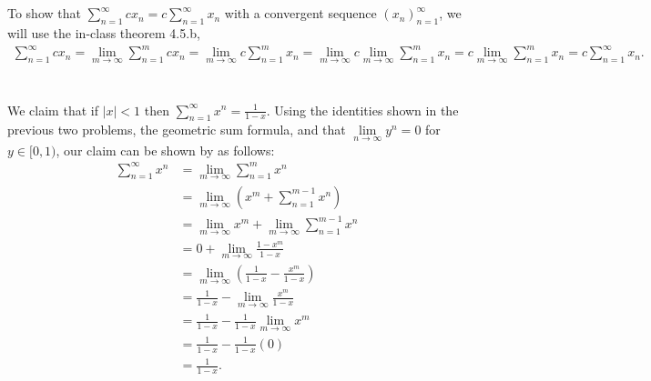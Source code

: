 \documentclass[12 pt,letterpaper]{article}
\begin{document}
\section{}
To show that \(\sum_{n=1}^{\infty}cx_n = c\sum_{n=1}^{\infty}x_n\)
with a convergent sequence \((x_n)_{n=1}^\infty\), we will use the in-class theorem 4.5.b,
\begin{align*}
    \sum_{n=1}^{\infty}cx_n
    = \lim\limits_{m\rightarrow\infty} \sum_{n=1}^{m}cx_n
    = \lim\limits_{m\rightarrow\infty} c \sum_{n=1}^{m}x_n
    = \lim\limits_{m\rightarrow\infty} c \lim\limits_{m\rightarrow\infty} \sum_{n=1}^{m}x_n
    = c \lim\limits_{m\rightarrow\infty} \sum_{n=1}^{m}x_n
    = c \sum_{n=1}^{\infty}x_n.
\end{align*}

\section{}
We claim that if \(|x|<1\) then \(\sum_{n=1}^{\infty}x^n = \frac{1}{1-x}\).
Using the identities shown in the previous two problems, the geometric sum formula,
and that \(\lim\limits_{n\rightarrow\infty}y^n=0\) for \(y\in[0,1)\),
our claim can be shown by as follows:
\begin{align*}
    \sum_{n=1}^{\infty}x^n
    &= \lim\limits_{m\rightarrow\infty} \sum_{n=1}^{m}x^n \\
    &= \lim\limits_{m\rightarrow\infty} \left( x^m + \sum_{n=1}^{m-1}x^n \right) \\
    &= \lim\limits_{m\rightarrow\infty} x^m 
    + \lim\limits_{m\rightarrow\infty} \sum_{n=1}^{m-1}x^n \\
    &= 0 + \lim\limits_{m\rightarrow\infty} \frac{1-x^m}{1-x} \\
    &= \lim\limits_{m\rightarrow\infty} \left( \frac{1}{1-x} - \frac{x^m}{1-x} \right) \\
    &= \frac{1}{1-x} - \lim\limits_{m\rightarrow\infty} \frac{x^m}{1-x} \\
    &= \frac{1}{1-x} - \frac{1}{1-x}\lim\limits_{m\rightarrow\infty} x^m \\
    &= \frac{1}{1-x} - \frac{1}{1-x}(0) \\
    &= \frac{1}{1-x}.
\end{align*}

\clearpage
\end{document}

